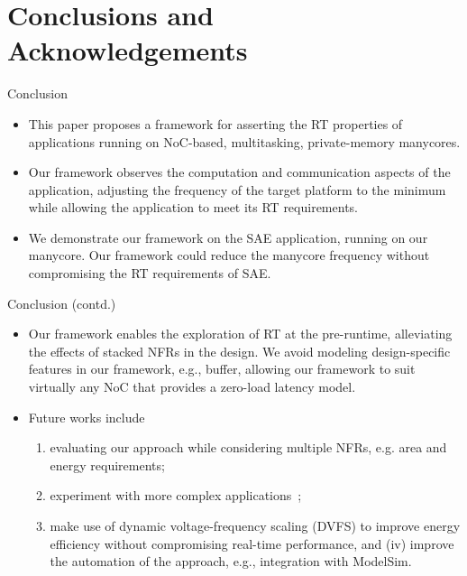 \section{Conclusions and Acknowledgements}

\begin{frame}{Conclusion}

	\begin{itemize}
		\item This paper proposes a framework for asserting the RT properties of applications running on NoC-based, multitasking, private-memory manycores. 
		
		\item Our framework observes the computation and communication  aspects of the application, adjusting the frequency of the target platform to the minimum while allowing the application to meet its RT requirements. 
		
		\item We demonstrate our framework on the SAE application, running on our manycore. Our framework could reduce the manycore frequency without compromising the RT requirements of SAE.%
	\end{itemize}

\end{frame}

\begin{frame}{Conclusion (contd.)}
	
	\begin{itemize}
	\item Our framework enables the exploration of RT at the pre-runtime, alleviating the effects of stacked NFRs in the design. We avoid modeling design-specific features in our framework, e.g., buffer, allowing our framework to suit virtually any NoC that provides a zero-load latency model. 
	
	\item Future works include 
	\begin{enumerate}

		\item evaluating our approach while considering multiple NFRs, e.g. area and energy requirements; 
		
		\item experiment with more complex applications~\cite{shi:2010}; 
		
		\item make use of dynamic voltage-frequency scaling (DVFS) to improve energy efficiency without compromising real-time performance, and (iv) improve the automation of the approach, e.g., integration with ModelSim.
		
	\end{enumerate}
	\end{itemize}


\end{frame}

